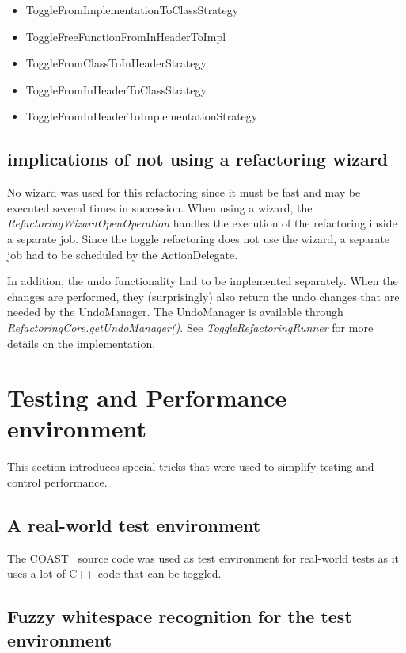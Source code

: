 \begin{itemize}
\item ToggleFromImplementationToClassStrategy
\item ToggleFreeFunctionFromInHeaderToImpl
\item ToggleFromClassToInHeaderStrategy
\item ToggleFromInHeaderToClassStrategy
\item ToggleFromInHeaderToImplementationStrategy
\end{itemize}

\subsection{implications of not using a refactoring wizard}
No wizard was used for this refactoring since it must be fast and may be 
executed several times in succession. When using a wizard, the 
\textit{RefactoringWizardOpenOperation} handles the execution of the refactoring 
inside a separate job. Since the toggle refactoring does not use the wizard, a 
separate job had to be scheduled by the ActionDelegate.

In addition, the undo functionality had to be implemented separately. When the 
changes are performed, they (surprisingly) also return the undo changes that are 
needed by the UndoManager. The UndoManager is available through 
\textit{RefactoringCore.getUndoManager()}. See \textit{ToggleRefactoringRunner} 
for more details on the implementation.

\section{Testing and Performance environment}

This section introduces special tricks that were used to simplify testing and
control performance.

\subsection{A real-world test environment}
The COAST~\cite{COAST} source code was used as test environment for real-world 
tests as it uses a lot of C++ code that can be toggled.

\subsection[Fuzzy whitespace recognition for the tests]{Fuzzy whitespace 
recognition for the test environment}

